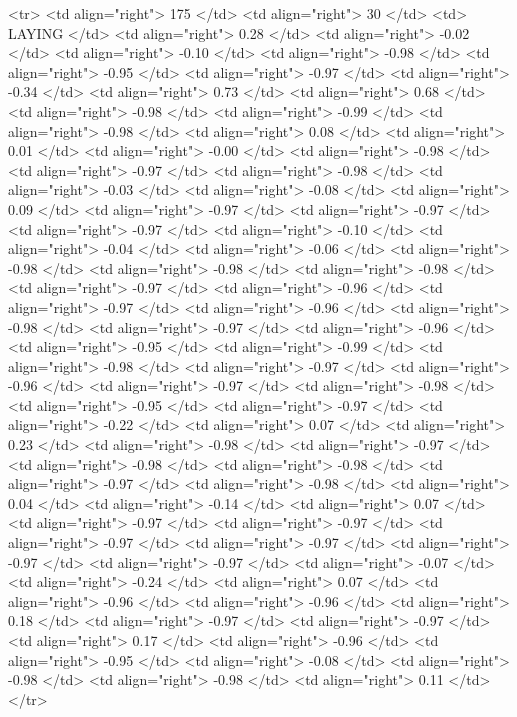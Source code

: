   <tr> <td align="right"> 175 </td> <td align="right">  30 </td> <td> LAYING </td> <td align="right"> 0.28 </td> <td align="right"> -0.02 </td> <td align="right"> -0.10 </td> <td align="right"> -0.98 </td> <td align="right"> -0.95 </td> <td align="right"> -0.97 </td> <td align="right"> -0.34 </td> <td align="right"> 0.73 </td> <td align="right"> 0.68 </td> <td align="right"> -0.98 </td> <td align="right"> -0.99 </td> <td align="right"> -0.98 </td> <td align="right"> 0.08 </td> <td align="right"> 0.01 </td> <td align="right"> -0.00 </td> <td align="right"> -0.98 </td> <td align="right"> -0.97 </td> <td align="right"> -0.98 </td> <td align="right"> -0.03 </td> <td align="right"> -0.08 </td> <td align="right"> 0.09 </td> <td align="right"> -0.97 </td> <td align="right"> -0.97 </td> <td align="right"> -0.97 </td> <td align="right"> -0.10 </td> <td align="right"> -0.04 </td> <td align="right"> -0.06 </td> <td align="right"> -0.98 </td> <td align="right"> -0.98 </td> <td align="right"> -0.98 </td> <td align="right"> -0.97 </td> <td align="right"> -0.96 </td> <td align="right"> -0.97 </td> <td align="right"> -0.96 </td> <td align="right"> -0.98 </td> <td align="right"> -0.97 </td> <td align="right"> -0.96 </td> <td align="right"> -0.95 </td> <td align="right"> -0.99 </td> <td align="right"> -0.98 </td> <td align="right"> -0.97 </td> <td align="right"> -0.96 </td> <td align="right"> -0.97 </td> <td align="right"> -0.98 </td> <td align="right"> -0.95 </td> <td align="right"> -0.97 </td> <td align="right"> -0.22 </td> <td align="right"> 0.07 </td> <td align="right"> 0.23 </td> <td align="right"> -0.98 </td> <td align="right"> -0.97 </td> <td align="right"> -0.98 </td> <td align="right"> -0.98 </td> <td align="right"> -0.97 </td> <td align="right"> -0.98 </td> <td align="right"> 0.04 </td> <td align="right"> -0.14 </td> <td align="right"> 0.07 </td> <td align="right"> -0.97 </td> <td align="right"> -0.97 </td> <td align="right"> -0.97 </td> <td align="right"> -0.97 </td> <td align="right"> -0.97 </td> <td align="right"> -0.97 </td> <td align="right"> -0.07 </td> <td align="right"> -0.24 </td> <td align="right"> 0.07 </td> <td align="right"> -0.96 </td> <td align="right"> -0.96 </td> <td align="right"> 0.18 </td> <td align="right"> -0.97 </td> <td align="right"> -0.97 </td> <td align="right"> 0.17 </td> <td align="right"> -0.96 </td> <td align="right"> -0.95 </td> <td align="right"> -0.08 </td> <td align="right"> -0.98 </td> <td align="right"> -0.98 </td> <td align="right"> 0.11 </td> </tr>
